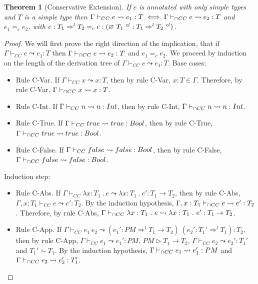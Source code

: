 \documentclass[a4paper]{article}
\newtheorem{theorem}{Theorem}[section]
\begin{document}
\begin{theorem}[Conservative Extension]
\label{conservative_extension_intersection_cast_insertion}
If $e$ is annotated with only simple types and $T$ is a simple type then $\Gamma \vdash_{CC} e \leadsto e_1 : T \iff \Gamma \vdash_{\cap CC} e \leadsto e_2 : T$ and $e_1 =_{c} e_2$, with $e : T_1 \Rightarrow^l T_2 =_{c} e : (\varnothing\ T_1\ ^{cl} : T_1 \Rightarrow^l T_2\ ^{cl})$.
\end{theorem}
\begin{proof}
We will first prove the right direction of the implication, that if $\Gamma \vdash_{CC} e \leadsto e_1 : T$ then $\Gamma \vdash_{\cap CC} e \leadsto e_2 : T$ and $e_1 =_{c} e_2$.
We proceed by induction on the length of the derivation tree of $\Gamma \vdash_{CC} e \leadsto e_1 : T$.
Base cases:
\begin{itemize}
    \item Rule C-Var.
    If $\Gamma \vdash_{CC} x \leadsto x : T$, then by rule C-Var, $x : T \in \Gamma$.
    Therefore, by rule C-Var, $\Gamma \vdash_{\cap CC} x \leadsto x : T$.
    \item Rule C-Int.
    If $\Gamma \vdash_{CC} n \leadsto n : {Int}$, then by rule C-Int, $\Gamma \vdash_{\cap CC} n \leadsto n : {Int}$.
    \item Rule C-True.
    If $\Gamma \vdash_{CC} true \leadsto true : Bool$, then by rule C-True, $\Gamma \vdash_{\cap CC} true \leadsto true : Bool$.
    \item Rule C-False.
    If $\Gamma \vdash_{CC} false \leadsto false : Bool$, then by rule C-False, $\Gamma \vdash_{\cap CC} false \leadsto false : Bool$.
\end{itemize}
Induction step:
\begin{itemize}
    \item Rule C-Abs.
    If $\Gamma \vdash_{CC} \lambda x : T_1\ .\ e \leadsto \lambda x : T_1\ .\ e' : T_1 \rightarrow T_2$, then by rule C-Abs, $\Gamma, x : T_1 \vdash_{CC} e \leadsto e' : T_2$.
    By the induction hypothesis, $\Gamma, x : T_1 \vdash_{\cap CC} e \leadsto e' : T_2$.
    Therefore, by rule C-Abs, $\Gamma \vdash_{\cap CC} \lambda x : T_1\ .\ e \leadsto \lambda x : T_1\ .\ e' : T_1 \rightarrow T_2$.
    \item Rule C-App.
    If $\Gamma \vdash_{CC} e_1\ e_2 \leadsto (e_1' : PM \Rightarrow^l T_1 \rightarrow T_2)\ (e_2' : T_1' \Rightarrow^l T_1) : T_2$, then by rule C-App, $\Gamma \vdash_{CC} e_1 \leadsto e_1' : PM$, $PM \rhd T_1 \rightarrow T_2$, $\Gamma \vdash_{CC} e_2 \leadsto e_2' : T_1'$ and $T_1' \sim T_1$.
    By the induction hypothesis, $\Gamma \vdash_{\cap CC} e_1 \leadsto e_1' : PM$ and $\Gamma \vdash_{\cap CC} e_2 \leadsto e_2' : T_1'$.

\end{itemize}
\end{proof}
\end{document}
